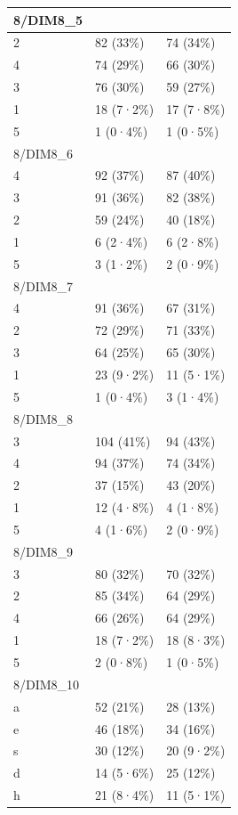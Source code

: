 \documentclass[
]{book}
\begin{document}
\begin{tabular}{l|l|l}
\hline
8/DIM8\_5 &  & \\
\hline
2 & 82 (33\%) & 74 (34\%)\\
\hline
4 & 74 (29\%) & 66 (30\%)\\
\hline
3 & 76 (30\%) & 59 (27\%)\\
\hline
1 & 18 (7·2\%) & 17 (7·8\%)\\
\hline
5 & 1 (0·4\%) & 1 (0·5\%)\\
\hline
8/DIM8\_6 &  & \\
\hline
4 & 92 (37\%) & 87 (40\%)\\
\hline
3 & 91 (36\%) & 82 (38\%)\\
\hline
2 & 59 (24\%) & 40 (18\%)\\
\hline
1 & 6 (2·4\%) & 6 (2·8\%)\\
\hline
5 & 3 (1·2\%) & 2 (0·9\%)\\
\hline
8/DIM8\_7 &  & \\
\hline
4 & 91 (36\%) & 67 (31\%)\\
\hline
2 & 72 (29\%) & 71 (33\%)\\
\hline
3 & 64 (25\%) & 65 (30\%)\\
\hline
1 & 23 (9·2\%) & 11 (5·1\%)\\
\hline
5 & 1 (0·4\%) & 3 (1·4\%)\\
\hline
8/DIM8\_8 &  & \\
\hline
3 & 104 (41\%) & 94 (43\%)\\
\hline
4 & 94 (37\%) & 74 (34\%)\\
\hline
2 & 37 (15\%) & 43 (20\%)\\
\hline
1 & 12 (4·8\%) & 4 (1·8\%)\\
\hline
5 & 4 (1·6\%) & 2 (0·9\%)\\
\hline
8/DIM8\_9 &  & \\
\hline
3 & 80 (32\%) & 70 (32\%)\\
\hline
2 & 85 (34\%) & 64 (29\%)\\
\hline
4 & 66 (26\%) & 64 (29\%)\\
\hline
1 & 18 (7·2\%) & 18 (8·3\%)\\
\hline
5 & 2 (0·8\%) & 1 (0·5\%)\\
\hline
8/DIM8\_10 &  & \\
\hline
a & 52 (21\%) & 28 (13\%)\\
\hline
e & 46 (18\%) & 34 (16\%)\\
\hline
s & 30 (12\%) & 20 (9·2\%)\\
\hline
d & 14 (5·6\%) & 25 (12\%)\\
\hline
h & 21 (8·4\%) & 11 (5·1\%)\\

\end{tabular}
\end{document}
